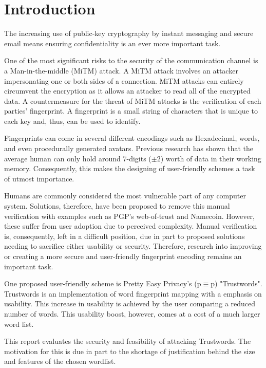 \section{Introduction}

The increasing use of public-key cryptography by instant messaging and secure email means ensuring confidentiality is an ever more important task.

One of the most significant risks to the security of the communication channel is a Man-in-the-middle (MiTM) attack. A MiTM attack involves an attacker impersonating one or both sides of a connection. MiTM attacks can entirely circumvent the encryption as it allows an attacker to read all of the encrypted data. A countermeasure for the threat of MiTM attacks is the verification of each parties’ fingerprint. A fingerprint is a small string of characters that is unique to each key and, thus, can be used to identify.

Fingerprints can come in several different encodings such as Hexadecimal, words, and even procedurally generated avatars. Previous research has shown that the average human can only hold around 7-digits ($\pm 2$) worth of data in their working memory\cite{miller1956magical}. Consequently, this makes the designing of user-friendly schemes a task of utmost importance.

Humans are commonly considered the most vulnerable part of any computer system. Solutions, therefore, have been proposed to remove this manual verification with examples such as PGP's web-of-trust\cite{callas1998openpgp} and Namecoin\cite{kalodner2015empirical}. However, these suffer from user adoption due to perceived complexity. Manual verification is, consequently, left in a difficult position, due in part to proposed solutions needing to sacrifice either usability or security. Therefore, research into improving or creating a more secure and user-friendly fingerprint encoding remains an important task.

One proposed user-friendly scheme is Pretty Easy Privacy's (p$\equiv$p) "Trustwords". Trustwords is an implementation of word fingerprint mapping with a emphasis on usability. This increase in usability is achieved by the user comparing a reduced number of words. This usability boost, however, comes at a cost of a much larger word list.

This report evaluates the security and feasibility of attacking Trustwords. The motivation for this is due in part to the shortage of justification behind the size and features of the chosen wordlist.